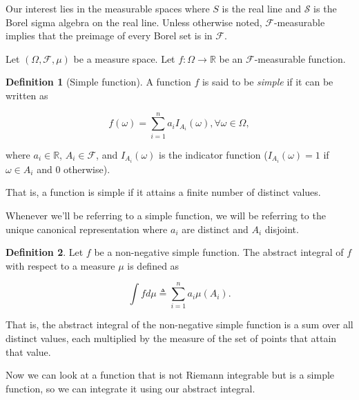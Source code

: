 \documentclass{book}
\theoremstyle{plain}%
\theoremstyle{definition}
\newtheorem{definition}{Definition}[section]
\newlength{\arrow}
\begin{document}
Our interest lies in the measurable spaces where $S$ is the real line and $\mathcal{S}$ is the Borel sigma algebra on the real line. Unless otherwise noted, $\mathcal{F}$-measurable implies that the preimage of every Borel set is in $\mathcal{F}$.

Let $(\Omega, \mathcal{F}, \mu)$ be a measure space. Let $f: \Omega \rightarrow \mathbb{R}$ be an $\mathcal{F}$-measurable function.

\begin{definition}[Simple function]
A function $f$ is said to be \emph{simple} if it can be written as

$$f(\omega) = \sum_{i=1}^n a_i I_{A_i}(\omega), \forall \omega \in \Omega,$$

where $a_i \in \mathbb{R}$, $A_i \in \mathcal{F}$, and $I_{A_i}(\omega)$ is the indicator function ($I_{A_i}(\omega) = 1$ if $\omega \in A_i$ and 0 otherwise).
\end{definition}

That is, a function is simple if it attains a finite number of distinct values.

Whenever we'll be referring to a simple function, we will be referring to the unique canonical representation where $a_i$ are distinct and $A_i$ disjoint.

\begin{definition}
Let $f$ be a non-negative simple function. The abstract integral of $f$ with respect to a measure $\mu$ is defined as

$$\int f d\mu \triangleq \sum_{i=1}^n a_i\mu(A_i).$$
\end{definition}

That is, the abstract integral of the non-negative simple function is a sum over all distinct values, each multiplied by the measure of the set of points that attain that value.

Now we can look at a function that is not Riemann integrable but is a simple function, so we can integrate it using our abstract integral.
\end{document}
